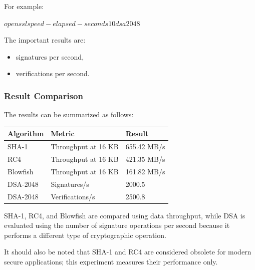 \documentclass[a4paper, 10pt]{article}
\begin{document}
\begin{problem}
\begin{subproblems_alpha}
\begin{solution}
		      For example:

		      \begin{codingbox}[language=bash, deletekeywords={in}]
$ openssl speed -elapsed -seconds 10 dsa2048
$
\end{codingbox}

		      The important results are:

		      \begin{itemize}
			      \item signatures per second,
			      \item verifications per second.
		      \end{itemize}

		      \subsubsection*{Result Comparison}

		      The results can be summarized as follows:

		      \begin{center}
			      \begin{tabular}{|l|l|l|}
				      \hline
				      \textbf{Algorithm} & \textbf{Metric}     & \textbf{Result} \\
				      \hline
				      SHA-1              & Throughput at 16 KB & 655.42 MB/s     \\
				      RC4                & Throughput at 16 KB & 421.35 MB/s     \\
				      Blowfish           & Throughput at 16 KB & 161.82 MB/s     \\
				      DSA-2048           & Signatures/s        & 2000.5          \\
				      DSA-2048           & Verifications/s     & 2500.8          \\
				      \hline
			      \end{tabular}
		      \end{center}

		      SHA-1, RC4, and Blowfish are compared using data throughput,
		      while DSA is evaluated using the number of signature operations per second
		      because it performs a different type of cryptographic operation.

		      It should also be noted that SHA-1 and RC4 are considered obsolete
		      for modern secure applications;
		      this experiment measures their performance only.
	      \end{solution}
	      \myspace[v][3][mm]


\end{subproblems_alpha}
\end{problem}
\end{document}
